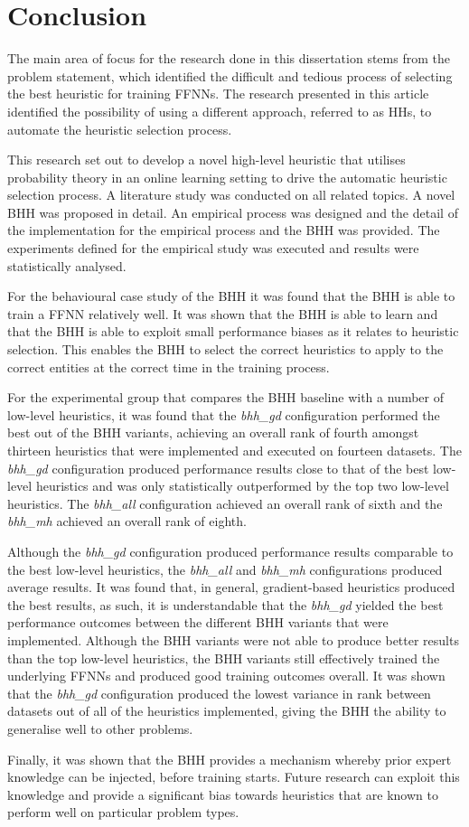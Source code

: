 \section{Conclusion}
\label{sec:conclusion}

The main area of focus for the research done in this dissertation stems from the problem statement, which identified the difficult and tedious process of selecting the best heuristic for training \acp{FFNN}. The research presented in this article identified the possibility of using a different approach, referred to as \acp{HH}, to automate the heuristic selection process.

This research set out to develop a novel high-level heuristic that utilises probability theory in an online learning setting to drive the automatic heuristic selection process. A literature study was conducted on all related topics. A novel \acs{BHH} was proposed in detail. An empirical process was designed and the detail of the implementation for the empirical process and the \acs{BHH} was provided. The experiments defined for the empirical study was executed and results were statistically analysed.

For the behavioural case study of the \acs{BHH} it was found that the \ac{BHH} is able to train a \acs{FFNN} relatively well. It was shown that the \ac{BHH} is able to learn and that the \acs{BHH} is able to exploit small performance biases as it relates to heuristic selection. This enables the \acs{BHH} to select the correct heuristics to apply to the correct entities at the correct time in the training process.

For the experimental group that compares the \acs{BHH} baseline with a number of low-level heuristics, it was found that the \textit{bhh\_gd} configuration performed the best out of the \acs{BHH} variants, achieving an overall rank of fourth amongst thirteen heuristics that were implemented and executed on fourteen datasets. The \textit{bhh\_gd} configuration produced performance results close to that of the best low-level heuristics and was only statistically outperformed by the top two low-level heuristics. The \textit{bhh\_all} configuration achieved an overall rank of sixth and the \textit{bhh\_mh} achieved an overall rank of eighth.

Although the \textit{bhh\_gd} configuration produced performance results comparable to the best low-level heuristics, the \textit{bhh\_all} and \textit{bhh\_mh} configurations produced average results. It was found that, in general, gradient-based heuristics produced the best results, as such, it is understandable that the \textit{bhh\_gd} yielded the best performance outcomes between the different \acs{BHH} variants that were implemented. Although the \acs{BHH} variants were not able to produce better results than the top low-level heuristics, the \acs{BHH} variants still effectively trained the underlying \acp{FFNN} and produced good training outcomes overall. It was shown that the \textit{bhh\_gd} configuration produced the lowest variance in rank between datasets out of all of the heuristics implemented, giving the \acs{BHH} the ability to generalise well to other problems.

Finally, it was shown that the \acs{BHH} provides a mechanism whereby prior expert knowledge can be injected, before training starts. Future research can exploit this knowledge and provide a significant bias towards heuristics that are known to perform well on particular problem types.
